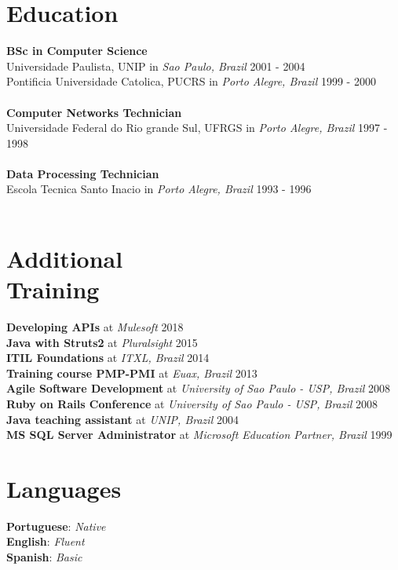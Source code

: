 \documentclass[margin]{res}
\begin{document}
\begin{resume}
\pagebreak
\section{Education}
    \textbf{BSc in Computer Science} \\
        {Universidade Paulista, UNIP} in \textit{Sao Paulo, Brazil} \hfill 2001 - 2004 \\
        {Pontificia Universidade Catolica, PUCRS} in \textit{Porto Alegre, Brazil} \hfill 1999 - 2000 \\
        \\
    \textbf{Computer Networks Technician} \\
        {Universidade Federal do Rio grande Sul, UFRGS} in \textit{Porto Alegre, Brazil} \hfill 1997 - 1998 \\
        \\
    \textbf{Data Processing Technician} \\
        {Escola Tecnica Santo Inacio} in \textit{Porto Alegre, Brazil} \hfill 1993 - 1996 \\
        \\

\section{Additional \\ Training}
\textbf{Developing APIs} at \textit{Mulesoft} \hfill 2018 \\
\textbf{Java with Struts2} at \textit{Pluralsight} \hfill 2015 \\
\textbf{ITIL Foundations} at \textit{ITXL, Brazil} \hfill 2014 \\
\textbf{Training course PMP-PMI} at \textit{Euax, Brazil} \hfill 2013 \\
\textbf{Agile Software Development} at \textit{University of Sao Paulo - USP, Brazil} \hfill 2008 \\
\textbf{Ruby on Rails Conference} at \textit{University of Sao Paulo - USP, Brazil} \hfill 2008 \\
\textbf{Java teaching assistant} at \textit{UNIP, Brazil} \hfill 2004 \\
\textbf{MS SQL Server Administrator} at \textit{Microsoft Education Partner, Brazil} \hfill 1999 \\

\section{Languages} 
    \textbf{Portuguese}: \textit{Native} \\
    \textbf{English}: \textit{Fluent} \\
    \textbf{Spanish}: \textit{Basic} \\


\end{resume}
\end{document}

